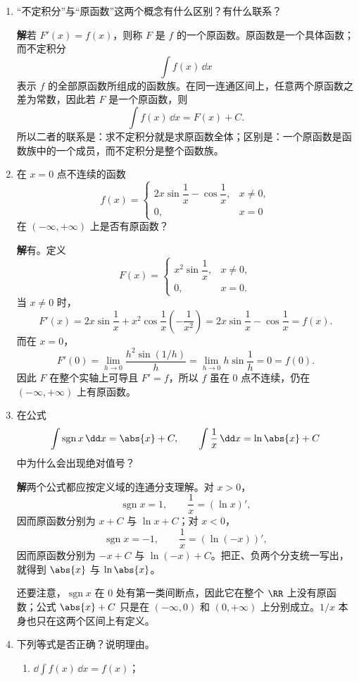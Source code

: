\begin{enumerate}
  \item “不定积分”与“原函数”这两个概念有什么区别？有什么联系？

  \textbf{解}\quad 若 $F'(x)=f(x)$，则称 $F$ 是 $f$ 的一个原函数。原函数是一个具体函数；而不定积分
  \[
    \int f(x)\,\dd x
  \]
  表示 $f$ 的全部原函数所组成的函数族。在同一连通区间上，任意两个原函数之差为常数，因此若 $F$ 是一个原函数，则
  \[
    \int f(x)\,\dd x=F(x)+C.
  \]
  所以二者的联系是：求不定积分就是求原函数全体；区别是：一个原函数是函数族中的一个成员，而不定积分是整个函数族。

  \item 在 $x=0$ 点不连续的函数
  \[
    f(x)=
    \begin{cases}
      2x\sin\dfrac1x-\cos\dfrac1x,&x\ne0,\\
      0,&x=0
    \end{cases}
  \]
  在 $(-\infty,+\infty)$ 上是否有原函数？

  \textbf{解}\quad 有。定义
  \[
    F(x)=
    \begin{cases}
      x^2\sin\dfrac1x,&x\ne0,\\
      0,&x=0.
    \end{cases}
  \]
  当 $x\ne0$ 时，
  \[
    F'(x)=2x\sin\frac1x+x^2\cos\frac1x\left(-\frac1{x^2}\right)
    =2x\sin\frac1x-\cos\frac1x=f(x).
  \]
  而在 $x=0$，
  \[
    F'(0)=\lim_{h\to0}\frac{h^2\sin(1/h)}{h}
    =\lim_{h\to0}h\sin\frac1h=0=f(0).
  \]
  因此 $F$ 在整个实轴上可导且 $F'=f$，所以 $f$ 虽在 $0$ 点不连续，仍在 $(-\infty,+\infty)$ 上有原函数。

  \item 在公式
  \[
    \int\operatorname{sgn}x\,\dd x=\abs{x}+C,
    \qquad
    \int\frac1x\,\dd x=\ln\abs{x}+C
  \]
  中为什么会出现绝对值号？

  \textbf{解}\quad 两个公式都应按定义域的连通分支理解。对 $x>0$，
  \[
    \operatorname{sgn}x=1,
    \qquad
    \frac1x=(\ln x)',
  \]
  因而原函数分别为 $x+C$ 与 $\ln x+C$；对 $x<0$，
  \[
    \operatorname{sgn}x=-1,
    \qquad
    \frac1x=(\ln(-x))',
  \]
  因而原函数分别为 $-x+C$ 与 $\ln(-x)+C$。把正、负两个分支统一写出，就得到 $\abs{x}$ 与 $\ln\abs{x}$。

  还要注意，$\operatorname{sgn}x$ 在 $0$ 处有第一类间断点，因此它在整个 $\RR$ 上没有原函数；公式 $\abs{x}+C$ 只是在 $(-\infty,0)$ 和 $(0,+\infty)$ 上分别成立。$1/x$ 本身也只在这两个区间上有定义。

  \item 下列等式是否正确？说明理由。
  \begin{enumerate}[label=(\arabic*)]
    \item $\dd\int f(x)\,\dd x=f(x)$；


\end{enumerate}
\end{enumerate}
